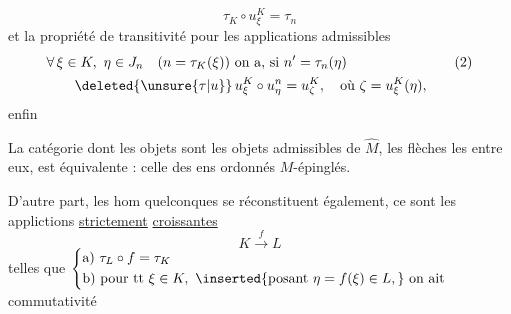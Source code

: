 \begingroup\makeatletter\tagsleft@true\makeatother
\[
\tau_K\circ u_\xi^K=\tau_n\tag*{(1)}
\]
et la propriété de transitivité pour les applications admissibles
\[
\begin{aligned}[t]
&\forall\,\xi\in K,\ \eta\in J_n\quad(n=\tau_K(\xi))\ \text{on a, si }n'=\tau_n(\eta)\\
&\qquad\deleted{\unsure{\tau|u}}\,u_\xi^K\circ u_\eta^n=u_\zeta^K,\quad\text{où }\zeta=u_\xi^K(\eta),
\end{aligned}\tag*{(2)}
\]
\endgroup
enfin


La catégorie dont les objets sont les objets admissibles de $\widehat M$, les flèches les  entre eux, est équivalente : celle des ens ordonnés $M$-épinglés.

D'autre part, les hom quelconques  se réconstituent également, ce sont les applictions \uline{strictement} \uline{croissantes}
\[
K\xrightarrow{f}L
\]
telles que $\left\{\begin{aligned}
&\text{a) }\tau_L\circ f=\tau_K\\
&\text{b) pour tt }\xi\in K,\ \inserted{\text{posant }\eta=f(\xi)\in L,}\ \text{on ait}
\end{aligned}\right.$ commutativité 
